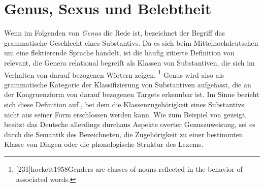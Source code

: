 



\section{Genus, Sexus und Belebtheit}
\label{sec:gendsex}

Wenn im Folgenden von \textit{Genus} die Rede ist, bezeichnet der Begriff das
grammatische Geschlecht eines Substantivs. Da es sich beim Mittelhochdeutschen
um eine flektierende Sprache handelt, ist die häufig zitierte Definition von
\citet[231]{hockett1958} relevant, die Genera relational begreift als Klassen
von Substantiven, die sich im Verhalten von darauf bezogenen Wörtern zeigen.%
%
	\footnote{[231]{hockett1958}{Genders are classes
		of nouns reflected in the behavior of associated words}.}
%
Genus wird also als grammatische Kategorie der Klassifizierung von Substantiven
aufgefasst, die an der Kongruenzform von darauf bezogenen Targets erkennbar
ist. Im Sinne  bezieht sich diese Definition auf
, bei dem die Klassenzugehörigkeit eines Substantivs nicht
aus seiner Form erschlossen werden kann. Wie zum Beispiel von
\citet{koepckezubin2017} gezeigt, besitzt das Deutsche allerdings durchaus
Aspekte overter Genuszuweisung, sei es durch die Semantik des Bezeichneten, die
Zugehörigkeit zu einer bestimmten Klasse von Dingen oder die phonologische
Struktur des Lexems.

